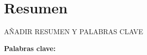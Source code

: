 \chapter*{Resumen}
{\color{red} AÑADIR RESUMEN Y PALABRAS CLAVE}

\vspace{.5cm}

\textbf{Palabras clave:}